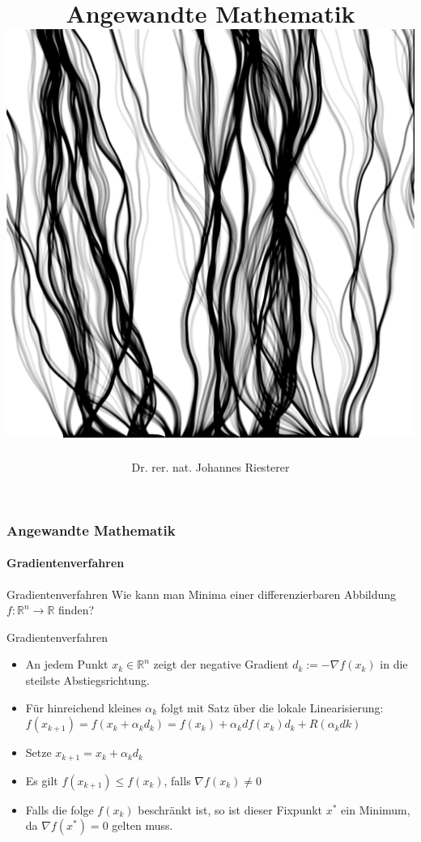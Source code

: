 \documentclass{beamer}
\begin{document}
\title[Angewandte Mathematik] %
{Angewandte Mathematik
\\
\includegraphics[scale=0.15]{images/cover}
}
\subtitle{}
\author[Dr. Johannes Riesterer] %
{Dr.  rer. nat. Johannes Riesterer}

\date[KPT 2004] %
{}

\subject{Angewandte Mathematik}




\begin{frame}
    \frametitle{Angewandte Mathematik}
\framesubtitle{Gradientenverfahren}
    \begin{block}{Gradientenverfahren}
Wie kann man Minima einer  differenzierbaren Abbildung $f: \mathbb{R}^n \to \mathbb{R}$ finden? 
 
\end{block}

    \begin{block}{Gradientenverfahren}
\begin{itemize}
\item An jedem Punkt $x_k \in  \mathbb{R}^n$ zeigt der negative Gradient  $d_k := -\nabla f (x_k)$ in die steilste Abstiegsrichtung.
\item Für hinreichend kleines $\alpha_k$ folgt mit Satz über die lokale Linearisierung:
$f(x_{k+1}) = f (x_k + \alpha_k d_k) =  f(x_k) + \alpha_k df(x_k)d_k + R( \alpha_k dk)$
\item  Setze $x_{k+1} = x_k + \alpha_k d_k$ 
\item Es gilt $f(x_{k+1}) \leq f(x_k)$, falls $\nabla f(x_k) \neq 0$
\item  Falls die folge $f(x_k)$ beschränkt ist, so ist  dieser Fixpunkt $x^*$ ein Minimum, da $\nabla f(x^*) = 0$ gelten muss.  
\end{itemize}

\end{block}
 \end{frame}
\end{document}
